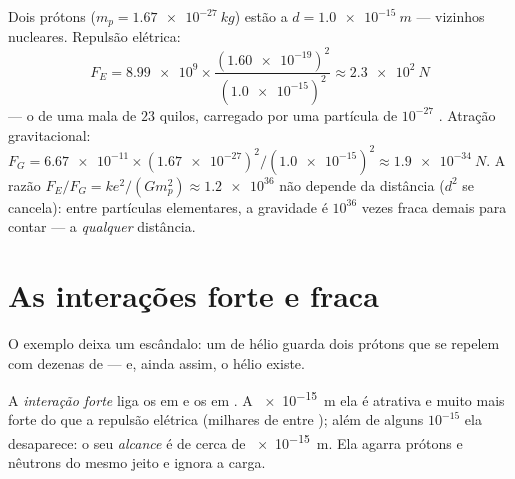 \begin{example}\label{ex:g11:fundamental-interactions:protons}
Dois prótons ($m_p = \qty{1.67e-27}{kg}$) estão a
$d = \qty{1.0e-15}{m}$ --- vizinhos nucleares. Repulsão elétrica:
\[
F_E = \num{8.99e9} \times
\frac{(\num{1.60e-19})^{2}}{(\num{1.0e-15})^{2}}
\approx \qty{2.3e2}{N}
\]
--- o  de uma mala de $23$ quilos, carregado por uma partícula de
$10^{-27}$ . Atração gravitacional:
$F_G = \num{6.67e-11} \times (\num{1.67e-27})^{2} /
(\num{1.0e-15})^{2} \approx \qty{1.9e-34}{N}$. A razão
$F_E / F_G = k e^{2} / (G m_p^{2}) \approx \num{1.2e36}$ não depende da
distância ($d^{2}$ se cancela): entre partículas elementares, a
gravidade é $10^{36}$ vezes fraca demais para contar --- a
\emph{qualquer} distância.
\end{example}

\section{As interações forte e fraca}

O exemplo deixa um escândalo: um  de hélio guarda dois prótons que
se repelem com dezenas de  --- e, ainda assim, o hélio existe.

\begin{definition}\label{def:g11:fundamental-interactions:strong}
A \emph{interação forte} liga os  em
 e os  em . A \qty{e-15}{m} ela é atrativa e muito
mais forte do que a repulsão elétrica (milhares de  entre
); além de alguns $10^{-15}$  ela desaparece: o seu
\emph{alcance} é de cerca de
\qty{e-15}{m}. Ela agarra prótons e nêutrons do mesmo jeito e ignora a
carga.
\end{definition}


